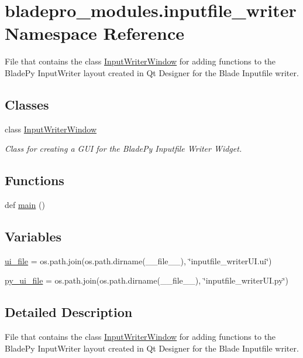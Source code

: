 \hypertarget{a00048}{}\section{bladepro\+\_\+modules.\+inputfile\+\_\+writer Namespace Reference}
\label{a00048}


File that contains the class \hyperlink{a00070}{Input\+Writer\+Window} for adding functions to the Blade\+Py Input\+Writer layout created in Qt Designer for the Blade Inputfile writer.  


\subsection*{Classes}
\begin{DoxyCompactItemize}
\item 
class \hyperlink{a00070}{Input\+Writer\+Window}
\begin{DoxyCompactList}\small\item\em Class for creating a G\+UI for the Blade\+Py Inputfile Writer Widget. \end{DoxyCompactList}\end{DoxyCompactItemize}
\subsection*{Functions}
\begin{DoxyCompactItemize}
\item 
def \hyperlink{a00048_af7196fb030213564f7a096e5437b03c6}{main} ()
\end{DoxyCompactItemize}
\subsection*{Variables}
\begin{DoxyCompactItemize}
\item 
\hyperlink{a00048_a1b76e57504b8ccc9af88c21882fd995f}{ui\+\_\+file} = os.\+path.\+join(os.\+path.\+dirname(\+\_\+\+\_\+file\+\_\+\+\_\+), \char`\"{}inputfile\+\_\+writer\+U\+I.\+ui\char`\"{})
\item 
\hyperlink{a00048_ad7ae10efada37c5353710ada1cb4b756}{py\+\_\+ui\+\_\+file} = os.\+path.\+join(os.\+path.\+dirname(\+\_\+\+\_\+file\+\_\+\+\_\+), \char`\"{}inputfile\+\_\+writer\+U\+I.\+py\char`\"{})
\end{DoxyCompactItemize}


\subsection{Detailed Description}
File that contains the class \hyperlink{a00070}{Input\+Writer\+Window} for adding functions to the Blade\+Py Input\+Writer layout created in Qt Designer for the Blade Inputfile writer. 

